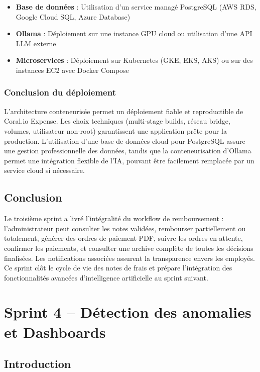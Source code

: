\documentclass[12pt,a4paper]{report}
\let\oldchapter\chapter
\def\chapter{\clearpage\setcounter{section}{0}\oldchapter}
\begin{document}
\begin{itemize}
    \item \textbf{Base de données} : Utilisation d'un service managé PostgreSQL (AWS RDS, Google Cloud SQL, Azure Database)
    \item \textbf{Ollama} : Déploiement sur une instance GPU cloud ou utilisation d'une API LLM externe
    \item \textbf{Microservices} : Déploiement sur Kubernetes (GKE, EKS, AKS) ou sur des instances EC2 avec Docker Compose
\end{itemize}

\subsection{Conclusion du déploiement}

L'architecture conteneurisée permet un déploiement fiable et reproductible de Coral.io Expense. Les choix techniques (multi-stage builds, réseau bridge, volumes, utilisateur non-root) garantissent une application prête pour la production. L'utilisation d'une base de données cloud pour PostgreSQL assure une gestion professionnelle des données, tandis que la conteneurisation d'Ollama permet une intégration flexible de l'IA, pouvant être facilement remplacée par un service cloud si nécessaire.

\section*{Conclusion}
Le troisième sprint a livré l'intégralité du workflow de remboursement : l'administrateur peut consulter les notes validées, rembourser partiellement ou totalement, générer des ordres de paiement PDF, suivre les ordres en attente, confirmer les paiements, et consulter une archive complète de toutes les décisions finalisées. Les notifications associées assurent la transparence envers les employés. Ce sprint clôt le cycle de vie des notes de frais et prépare l'intégration des fonctionnalités avancées d'intelligence artificielle au sprint suivant.




\chapter{Sprint 4 – Détection des anomalies et Dashboards}



\section*{Introduction}
\end{document}
